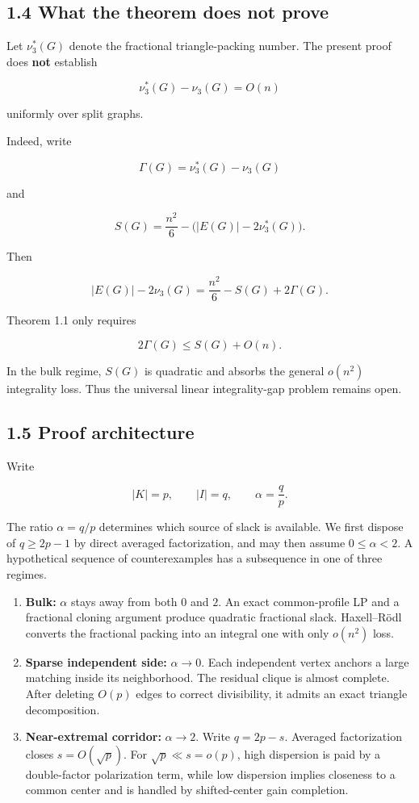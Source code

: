 \documentclass[english,11pt,a4paper]{article}
\begin{document}
\subsection{1.4 What the theorem does not
prove}\label{what-the-theorem-does-not-prove}

Let \(\nu_3^*(G)\) denote the fractional triangle-packing number. The
present proof does \textbf{not} establish

\[
\nu_3^*(G)-\nu_3(G)=O(n)
\tag{1.4}
\]

uniformly over split graphs.

Indeed, write

\[
\Gamma(G)=\nu_3^*(G)-\nu_3(G)
\]

and

\[
S(G)=\frac{n^2}{6}-\bigl(|E(G)|-2\nu_3^*(G)\bigr).
\]

Then

\[
|E(G)|-2\nu_3(G)
=
\frac{n^2}{6}-S(G)+2\Gamma(G).
\tag{1.5}
\]

Theorem 1.1 only requires

\[
2\Gamma(G)\le S(G)+O(n).
\]

In the bulk regime, \(S(G)\) is quadratic and absorbs the general
\(o(n^2)\) integrality loss. Thus the universal linear integrality-gap
problem remains open.

\subsection{1.5 Proof architecture}\label{proof-architecture}

Write

\[
|K|=p,
\qquad
|I|=q,
\qquad
\alpha=\frac qp.
\]

The ratio \(\alpha=q/p\) determines which source of slack is available.
We first dispose of \(q\ge2p-1\) by direct averaged factorization, and
may then assume \(0\le\alpha<2\). A hypothetical sequence of
counterexamples has a subsequence in one of three regimes.

\begin{enumerate}
\def\labelenumi{\arabic{enumi}.}
\item
  \textbf{Bulk:} \(\alpha\) stays away from both \(0\) and \(2\). An
  exact common-profile LP and a fractional cloning argument produce
  quadratic fractional slack. Haxell--Rödl converts the fractional
  packing into an integral one with only \(o(n^2)\) loss.
\item
  \textbf{Sparse independent side:} \(\alpha\to0\). Each independent
  vertex anchors a large matching inside its neighborhood. The residual
  clique is almost complete. After deleting \(O(p)\) edges to correct
  divisibility, it admits an exact triangle decomposition.
\item
  \textbf{Near-extremal corridor:} \(\alpha\to2\). Write \(q=2p-s\).
  Averaged factorization closes \(s=O(\sqrt p)\). For
  \(\sqrt p\ll s=o(p)\), high dispersion is paid by a double-factor
  polarization term, while low dispersion implies closeness to a common
  center and is handled by shifted-center gain completion.
\end{enumerate}
\end{document}
